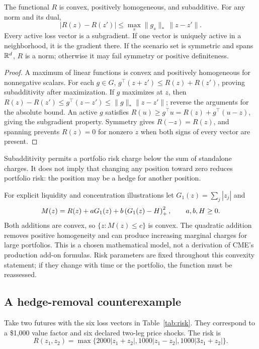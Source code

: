 \begin{proposition}\label{prop:risk}
The functional $R$ is convex, positively homogeneous, and subadditive. For any norm and its dual,
\begin{equation}
 |R(z)-R(z')|\le\max_s\|g_s\|_*\,\|z-z'\|.
\end{equation}
Every active loss vector is a subgradient. If one vector is uniquely active in a neighborhood, it is the gradient there. If the scenario set is symmetric and spans $\mathbb R^d$, $R$ is a norm; otherwise it may fail symmetry or positive definiteness.
\end{proposition}
\begin{proof}
A maximum of linear functions is convex and positively homogeneous for nonnegative scalars. For each $g\in G$, $g^\top(z+z')\le R(z)+R(z')$, proving subadditivity after maximization. If $g$ maximizes at $z$, then $R(z)-R(z')\le g^\top(z-z')\le\|g\|_*\|z-z'\|$; reverse the arguments for the absolute bound. An active $g$ satisfies $R(u)\ge g^\top u=R(z)+g^\top(u-z)$, giving the subgradient property. Symmetry gives $R(-z)=R(z)$, and spanning prevents $R(z)=0$ for nonzero $z$ when both signs of every vector are present.
\end{proof}

Subadditivity permits a portfolio risk charge below the sum of standalone charges. It does not imply that changing any position toward zero reduces portfolio risk: the position may be a hedge for another position.

For explicit liquidity and concentration illustrations let $G_1(z)=\sum_j|z_j|$ and
\begin{equation}
 M(z)=R(z)+aG_1(z)+b\left(G_1(z)-H\right)_+^2,
 \qquad a,b,H\ge0.
\label{eq:margin}
\end{equation}
Both additions are convex, so $\{z:M(z)\le c\}$ is convex. The quadratic addition removes positive homogeneity and can produce increasing marginal charges for large portfolios. This is a chosen mathematical model, not a derivation of CME's production add-on formulas. Risk parameters are fixed throughout this convexity statement; if they change with time or the portfolio, the function must be reassessed.

\subsection{A hedge-removal counterexample}

Take two futures with the six loss vectors in Table~\ref{tab:risk}. They correspond to a \$1,000 value factor and six declared two-leg price shocks. The risk is
\begin{equation}
 R(z_1,z_2)=\max\{2000|z_1+z_2|,
                  1000|z_1-z_2|,1000|3z_1+z_2|\}.
\end{equation}

